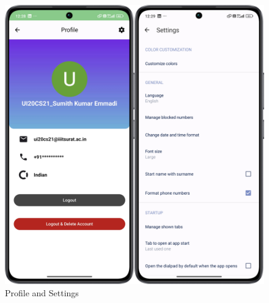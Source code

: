 \begin{figure}
    \centering
    \includegraphics[width=0.5\linewidth]{Media//whatsapp/profile}
    \caption{Profile and Settings}
    \label{fig:Profile and Settings}
\end{figure}

